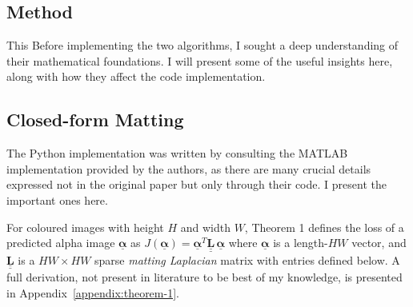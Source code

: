 \documentclass{article}
\def\vt#1{\underline{\mathbf{#1}}}
\def\vts#1{\underline{\boldsymbol{#1}}}
\def\mt#1{\underline{\underline{\mathbf{#1}}}}
\begin{document}
\begin{multicols}{2}[]


\section{Method}


This Before implementing the two algorithms, I sought a deep understanding of their mathematical foundations. I will present some of the useful insights here, along with how they affect the code implementation.

\subsection{Closed-form Matting}\label{s3-closed-form-matting}
The Python implementation was written by consulting the MATLAB implementation provided by the authors, as there are many crucial details expressed not in the original paper but only through their code. I present the important ones here.

For coloured images with height $H$ and width $W$, %
Theorem 1 \cite{closed-form-matting} defines the loss of a predicted alpha image $\vts \alpha$ as $ J(\vts \alpha) = \vts \alpha^T \mt L\, \vts \alpha$ where $\vts \alpha$ is a length-$HW$ vector, and $\mt L$ is a $HW\times HW$ sparse \emph{matting Laplacian} matrix with entries defined below. A full derivation, not present in literature to be best of my knowledge, is presented in Appendix~\ref{appendix:theorem-1}.


\end{multicols}
\end{document}
